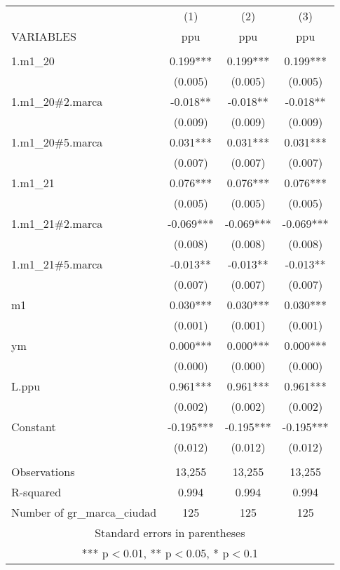 \begin{tabular}{lccc} \hline
 & (1) & (2) & (3) \\
VARIABLES & ppu & ppu & ppu \\ \hline
 &  &  &  \\
1.m1\_20 & 0.199*** & 0.199*** & 0.199*** \\
 & (0.005) & (0.005) & (0.005) \\
1.m1\_20\#2.marca & -0.018** & -0.018** & -0.018** \\
 & (0.009) & (0.009) & (0.009) \\
1.m1\_20\#5.marca & 0.031*** & 0.031*** & 0.031*** \\
 & (0.007) & (0.007) & (0.007) \\
1.m1\_21 & 0.076*** & 0.076*** & 0.076*** \\
 & (0.005) & (0.005) & (0.005) \\
1.m1\_21\#2.marca & -0.069*** & -0.069*** & -0.069*** \\
 & (0.008) & (0.008) & (0.008) \\
1.m1\_21\#5.marca & -0.013** & -0.013** & -0.013** \\
 & (0.007) & (0.007) & (0.007) \\
m1 & 0.030*** & 0.030*** & 0.030*** \\
 & (0.001) & (0.001) & (0.001) \\
ym & 0.000*** & 0.000*** & 0.000*** \\
 & (0.000) & (0.000) & (0.000) \\
L.ppu & 0.961*** & 0.961*** & 0.961*** \\
 & (0.002) & (0.002) & (0.002) \\
Constant & -0.195*** & -0.195*** & -0.195*** \\
 & (0.012) & (0.012) & (0.012) \\
 &  &  &  \\
Observations & 13,255 & 13,255 & 13,255 \\
R-squared & 0.994 & 0.994 & 0.994 \\
 Number of gr\_marca\_ciudad & 125 & 125 & 125 \\ \hline
\multicolumn{4}{c}{ Standard errors in parentheses} \\
\multicolumn{4}{c}{ *** p$<$0.01, ** p$<$0.05, * p$<$0.1} \\
\end{tabular}
